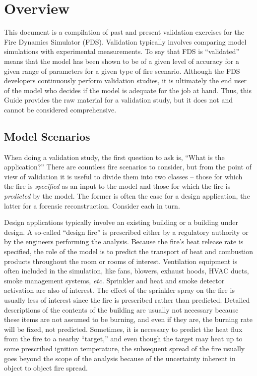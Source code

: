 
\chapter{Overview}

This document is a compilation of past and present validation exercises for the Fire Dynamics Simulator (FDS).
Validation typically involves comparing model simulations with experimental measurements. To say that FDS is
``validated'' means that the model has been shown to be of a given level of accuracy for a given range of parameters for a given
type of fire scenario. Although the FDS developers continuously perform validation studies, it is ultimately the end user of the model who
decides if the model is adequate for the job at hand. Thus, this Guide provides the raw material for a validation study, but it does not
and cannot be considered comprehensive.



\section{Model Scenarios}

When doing a validation study, the first question to ask is, ``What is the application?'' There are countless fire scenarios to consider, but from the
point of view of validation it is useful to divide them into two classes -- those for which the fire is {\em specified} as an input to the model and those for which the fire
is {\em predicted} by the model. The former is often the case for a design application, the latter for a forensic reconstruction. Consider each in turn.

Design  applications  typically  involve  an existing  building  or  a
building  under  design. A  so-called  ``design  fire'' is  prescribed
either by  a regulatory authority  or by the engineers  performing the
analysis. Because the  fire's heat release rate is  specified, the role of
the model is to predict  the transport of heat and combustion products
throughout  the room or  rooms of  interest. Ventilation  equipment is
often included  in the simulation, like fans,  blowers, exhaust hoods,
HVAC ducts,  smoke management systems,  {\em etc.} Sprinkler  and heat
and smoke detector activation are also of interest.  The effect of the
sprinkler spray on the fire is usually less of interest since the fire
is  prescribed rather  than  predicted. Detailed  descriptions of  the
contents of the building are usually not necessary because these items
are not assumed to be burning,  and even if they are, the burning rate
will be  fixed, not predicted.  Sometimes, it is necessary  to predict
the heat  flux from the fire  to a nearby ``target,''  and even though
the target  may heat up  to some prescribed ignition  temperature, the
subsequent spread  of the  fire usually goes  beyond the scope  of the
analysis because of the uncertainty  inherent in object to object fire
spread.

